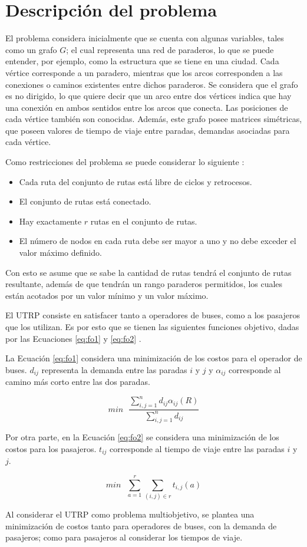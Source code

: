 \section{Descripción del problema}

El problema considera inicialmente que se cuenta con algunas variables, tales como un grafo $G$; el cual representa una red de paraderos, lo que se puede entender, por ejemplo, como la estructura que se tiene en una ciudad. Cada vértice corresponde a un paradero, mientras que los arcos corresponden a las conexiones o caminos existentes entre dichos paraderos. Se considera que el grafo es no dirigido, lo que quiere decir que un arco entre dos vértices indica que hay una conexión en ambos sentidos entre los arcos que conecta. Las posiciones de cada vértice también son conocidas. Además, este grafo posee matrices simétricas, que poseen valores de tiempo de viaje entre paradas, demandas asociadas para cada vértice.

Como restricciones del problema se puede considerar lo siguiente \cite{NewHaEOps}:
\begin{itemize}
\item Cada ruta del conjunto de rutas está libre de ciclos y retrocesos.
\item El conjunto de rutas está conectado.
\item Hay exactamente $r$ rutas en el conjunto de rutas.
\item El número de nodos en cada ruta debe ser mayor a uno y no debe exceder el valor máximo definido.
\end{itemize} 

Con esto se asume que se sabe la cantidad de rutas tendrá el conjunto de rutas resultante, además de que tendrán un rango paraderos permitidos, los cuales están acotados por un valor mínimo y un valor máximo.

El UTRP consiste en satisfacer tanto a operadores de buses, como a los pasajeros que los utilizan. Es por esto que se tienen las siguientes funciones objetivo, dadas por las Ecuaciones \eqref{eq:fo1} y \eqref{eq:fo2} \cite{NewHaEOps}.

La Ecuación \eqref{eq:fo1} considera una minimización de los costos para el operador de buses. $d_{ij}$ representa la demanda  entre las paradas $i$ y $j$ y $\alpha_{ij}$ corresponde al camino más corto entre las dos paradas.

\begin{equation}
\label{eq:fo1}
min\mbox{ }\frac{\sum^n_{i,j=1}d_{ij}\alpha_{ij}(R)}{\sum_{i,j=1}^{n}d_{ij}}
\end{equation} 

Por otra parte, en la Ecuación \eqref{eq:fo2} se considera una minimización de los costos para los pasajeros. $t_{ij}$ corresponde al tiempo de viaje entre las paradas $i$ y $j$. 

\begin{equation}
\label{eq:fo2}
min\mbox{ }\sum^r_{a=1}\sum_{(i,j) \in r} t_{i,j} (a)
\end{equation} 

Al considerar el UTRP como problema multiobjetivo, se plantea una minimización de costos tanto para operadores de buses, con la demanda de pasajeros; como para pasajeros al considerar los tiempos de viaje.
